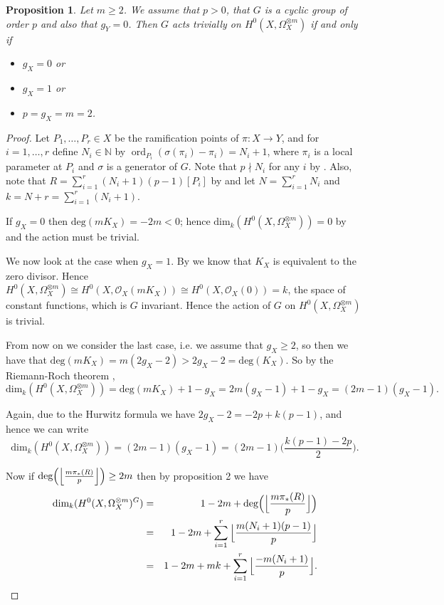 \documentclass[11pt]{article} %
\newtheorem{prop}{Proposition}
\DeclareMathOperator{\ord}{ord}
\begin{document}
\begin{prop}
	Let $m\geq 2$. We assume that $p>0$, that $G$ is a cyclic group of order $p$ and also that $g_Y=0$. Then $G$ acts 
	trivially on $H^0(X,\Omega_X^{\otimes m})$ if and only if
		\begin{itemize}
			\item
				$g_X=0$ or
			\item
				$g_X=1$ or
			\item
				$p=g_X=m=2$.
		\end{itemize}
\end{prop}
\begin{proof}

	Let $P_1,\ldots ,P_r\in X$ be the ramification points of $\pi:X\rightarrow Y$, and for $i=1,\ldots ,r$
	define $N_i\in \mathbb{N}$ by $\ord_{P_i}(\sigma(\pi_i)-\pi_i)=N_i+1$, where $\pi_i$ is a 
	local parameter at $P_i$ and $\sigma$ is a generator of $G$. Note that $p\nmid N_i$ for any $i$ by 
	\citep[Lem. 1, pg. 87]{naka}. Also, note that $R=\sum_{i=1}^r(N_i+1)(p-1)[P_i]$ by 
	\citep[Prop. 4, {\S}1, Ch. IV]{localfields} and let $N=\sum_{i=1}^rN_i$ and $k=N+r=\sum_{i=1}^r(N_i+1)$.

	If $g_X=0$ then $\mbox{deg}(mK_X)=-2m<0$; hence $\mbox{dim}_k(H^0(X,\Omega_X^{\otimes m}))=0$ by 
      \citep[prop. 3, {\S}8]{fulton} and the action must be trivial.

	We now look at the case when $g_X=1$. By \citep[Chap. IV,\ Example 1.3.6]{hart} we know that $K_X$ 
	is equivalent to the zero divisor. Hence 
	$H^0(X,\Omega_X^{\otimes m})\cong H^0(X,\mathscr{O}_X(mK_X)) \cong H^0(X,\mathscr{O}_X(0))=k$, 
	the space of constant functions, which is $G$ invariant. Hence the action of $G$ on $H^0(X,\Omega_X^{\otimes m})$ 
	is trivial.

	From now on we consider the last case, i.e. we assume that $g_X\geq 2$, so then we have that 
	$\mbox{deg}(mK_X)=m(2g_X-2)>2g_X-2=\mbox{deg}(K_X)$. So by the Riemann-Roch theorem \citep[Cor. 2, {\S}8]{fulton},
		\begin{equation}
		\mbox{dim}_k(H^0(X,\Omega_X^{\otimes m}))=\mbox{deg}(mK_X)+1-g_X=2m(g_X-1)+1-g_X=(2m-1)(g_X-1).
		\end{equation}

	Again, due to the Hurwitz formula we have $2g_X-2=-2p+k(p-1)$, and hence we can write
		\[
		\mbox{dim}_k(H^0(X,\Omega_X^{\otimes m}))=(2m-1)(g_X-1)=(2m-1)\Big(\frac{k(p-1)-2p}{2}\Big).
		\]

	Now if $\mbox{deg}\Big(\Big{\lfloor}{\frac{m\pi_*(R)}{p}}\Big{\rfloor}\Big)\geq 2m$ then by proposition 2 we have
		\begin{eqnarray*}	
			\mbox{dim}_k(H^0(X,\Omega_X^{\otimes m})^G) & = & 1-2m+\mbox{deg}\Big(\Big{\lfloor}{\frac{m\pi_*(R)}{p}}\Big{\rfloor}\Big) \\
			&= & 1-2m+\sum_{i=1}^r \Big{\lfloor}{\frac{m(N_i+1)(p-1)}{p}}\Big{\rfloor} \\
			&= & 1-2m+mk+\sum_{i=1}^r\Big{\lfloor}{\frac{-m(N_i+1)}{p}}\Big{\rfloor}. 
		\end{eqnarray*}
	

\end{proof}
\end{document}
